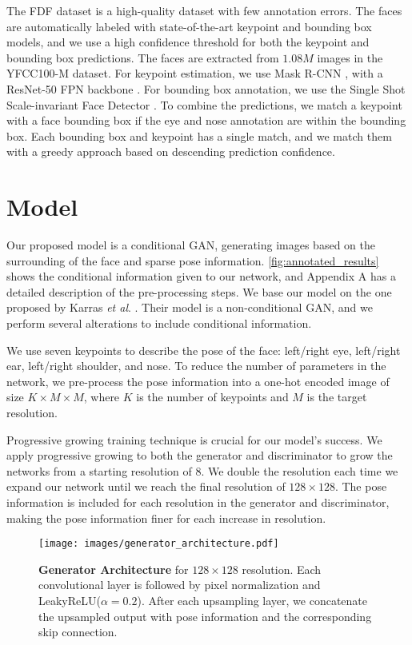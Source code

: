 \documentclass[runningheads]{llncs}
\newcommand{\etal}{\textit{et al}. }
\begin{document}
The FDF dataset is a high-quality dataset with few annotation errors. 
The faces are automatically labeled with state-of-the-art keypoint and bounding box models, and we use a high confidence threshold for both the keypoint and bounding box predictions.
The faces are  extracted from $1.08M$ images in the YFCC100-M dataset.  For keypoint estimation, we use Mask R-CNN \cite{He2017}, with a ResNet-50 FPN backbone \cite{Lin2017FeatureDetection}. For bounding box annotation, we use the Single Shot Scale-invariant Face Detector \cite{Zhang2017S3fd:Detector}. 
To combine the predictions, we match a keypoint with a face bounding box if the eye and nose annotation are within the bounding box.
Each bounding box and keypoint has a single match, and we match them with a greedy approach based on descending prediction confidence. \section{Model}

Our proposed model is a conditional GAN, generating images based on the surrounding of the face and sparse pose information. \autoref{fig:annotated_results} shows the conditional information given to our network, and Appendix A has a detailed description of the pre-processing steps.
We base our model on the one proposed by Karras \etal \cite{Karras2017}. Their model is a non-conditional GAN, and we perform several alterations to include conditional information. 


We use seven keypoints to describe the pose of the face: left/right eye, left/right ear, left/right shoulder, and nose. To reduce the number of parameters in the network, we pre-process the pose information into a one-hot encoded image of size $K \times M \times M$, where $K$ is the number of keypoints and $M$ is the target resolution. 

Progressive growing training technique is crucial for our model's success.
We apply progressive growing to both the generator and discriminator to grow the networks from a starting resolution of $8$. We double the resolution each time we expand our network until we reach the final resolution of $128 \times128$. 
The pose information is included for each resolution in the generator and discriminator, making the pose information finer for each increase in resolution.

\begin{figure}
    \centering
    \texttt{[image: images/generator\_architecture.pdf]}
    \caption{\textbf{Generator Architecture} for $128 \times 128$ resolution. Each convolutional layer is followed by pixel normalization \cite{Karras2017} and LeakyReLU($\alpha = 0.2$).
    After each upsampling layer, we concatenate the upsampled output with pose information and the corresponding skip connection.}
    \label{fig:generator_architecture}
\end{figure}
\end{document}
